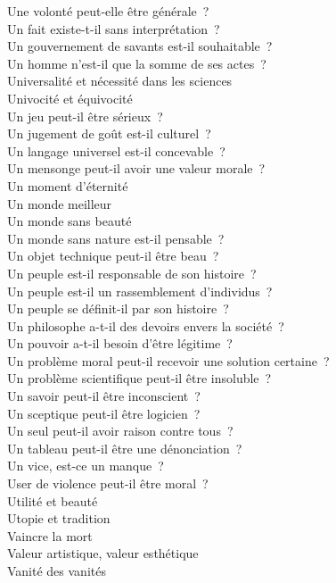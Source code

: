 \documentclass[a4paper,12pt]{article}
\begin{document}
Une volonté peut-elle être générale ? \\
Un fait existe-t-il sans interprétation ? \\
Un gouvernement de savants est-il souhaitable ? \\
Un homme n'est-il que la somme de ses actes ? \\
Universalité et nécessité dans les sciences \\
Univocité et équivocité \\
Un jeu peut-il être sérieux ? \\
Un jugement de goût est-il culturel ? \\
Un langage universel est-il concevable ? \\
Un mensonge peut-il avoir une valeur morale ? \\
Un moment d'éternité \\
Un monde meilleur \\
Un monde sans beauté \\
Un monde sans nature est-il pensable ? \\
Un objet technique peut-il être beau ? \\
Un peuple est-il responsable de son histoire ? \\
Un peuple est-il un rassemblement d'individus ? \\
Un peuple se définit-il par son histoire ? \\
Un philosophe a-t-il des devoirs envers la société ? \\
Un pouvoir a-t-il besoin d'être légitime ? \\
Un problème moral peut-il recevoir une solution certaine ? \\
Un problème scientifique peut-il être insoluble ? \\
Un savoir peut-il être inconscient ? \\
Un sceptique peut-il être logicien ? \\
Un seul peut-il avoir raison contre tous ? \\
Un tableau peut-il être une dénonciation ? \\
Un vice, est-ce un manque ? \\
User de violence peut-il être moral ? \\
Utilité et beauté \\
Utopie et tradition \\
Vaincre la mort \\
Valeur artistique, valeur esthétique \\
Vanité des vanités \\
\end{document}
